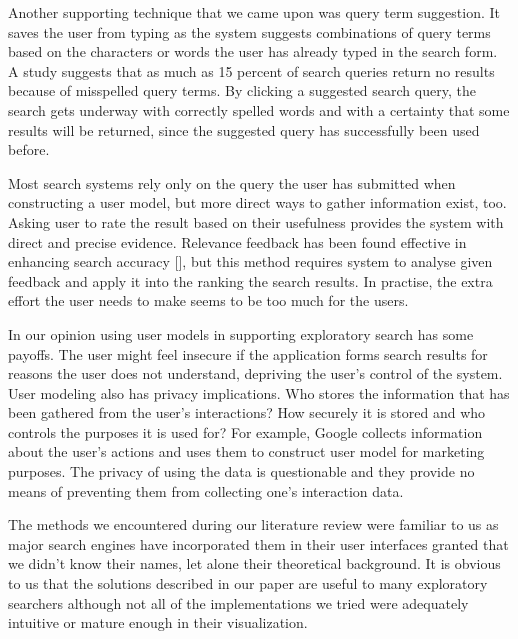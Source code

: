 Another supporting technique that we came upon was query term suggestion. It saves the user from typing as the system suggests combinations of query terms based on the characters or words the user has already typed in the search form. A study suggests that as much as 15 percent of search queries return no results because of misspelled query terms. By clicking a suggested search query, the search gets underway with correctly spelled words and with a certainty that some results will be returned, since the suggested query has successfully been used before.

Most search systems rely only on the query the user has submitted when constructing a user model, but more direct ways to gather information exist, too. Asking user to rate the result based on their usefulness provides the system with direct and precise evidence. Relevance feedback has been found effective in enhancing search accuracy [], but this method requires system to analyse given feedback and apply it into the ranking the search results. In practise, the extra effort the user needs to make seems to be too much for the users.

In our opinion using user models in supporting exploratory search has some payoffs. The user might feel insecure if the application forms search results for reasons the user does not understand, depriving the user's control of the system. User modeling also has privacy implications. Who stores the information that has been gathered from the user's interactions? How securely it is stored and who controls the purposes it is used for? For example, Google collects information about the user's actions and uses them to construct user model for marketing purposes. The privacy of using the data is questionable and they provide no means of preventing them from collecting one's interaction data. 

The methods we encountered during our literature review were familiar to us as major search engines have incorporated them in their user interfaces granted that we didn't know their names, let alone their theoretical background. It is obvious to us that the solutions described in our paper are useful to many exploratory searchers although not all of the implementations we tried were adequately intuitive or mature enough in their visualization.

